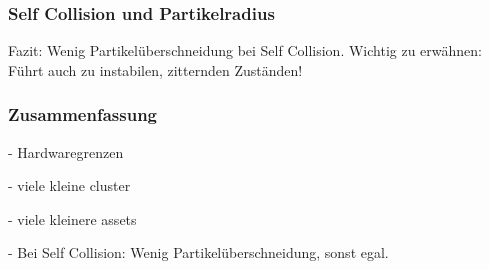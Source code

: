 



\subsubsection{Self Collision und Partikelradius}

Fazit: Wenig Partikelüberschneidung bei Self Collision. Wichtig zu erwähnen: Führt auch zu instabilen, zitternden Zuständen!



\subsubsection{Zusammenfassung}

- Hardwaregrenzen

- viele kleine cluster

- viele kleinere assets

- Bei Self Collision: Wenig Partikelüberschneidung, sonst egal.




%
%
%
%
%
%


